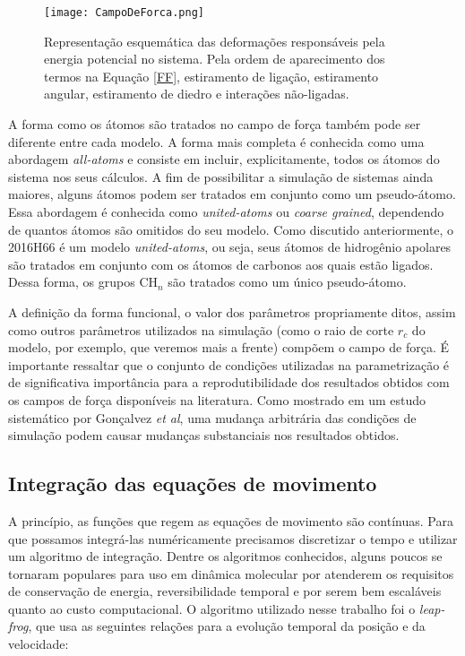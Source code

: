 \begin{figure}[ht!]
\centering
\texttt{[image: CampoDeForca.png]}
\caption{Representação esquemática das deformações responsáveis pela energia potencial no sistema. Pela ordem de aparecimento dos termos na Equação \ref{FF}, estiramento de ligação, estiramento angular, estiramento de diedro e interações não-ligadas.}
\label{CampoDeForca}
\end{figure}

A forma como os átomos são tratados no campo de força também pode ser diferente entre cada modelo.
A forma mais completa é conhecida como uma abordagem \textit{all-atoms} e consiste em incluir, explicitamente, todos os átomos do sistema nos seus cálculos.
A fim de possibilitar a simulação de sistemas ainda maiores, alguns átomos podem ser tratados em conjunto como um pseudo-átomo.
Essa abordagem é conhecida como \textit{united-atoms} ou \textit{coarse grained}, dependendo de quantos átomos são omitidos do seu modelo\cite{Allen2017}.
Como discutido anteriormente, o 2016H66\cite{Horta2016} é um modelo \textit{united-atoms}, ou seja, seus átomos de hidrogênio apolares são tratados em conjunto com os átomos de carbonos aos quais estão ligados.
Dessa forma, os grupos CH$_n$ são tratados como um único pseudo-átomo.

A definição da forma funcional, o valor dos parâmetros propriamente ditos, assim como outros parâmetros utilizados na simulação (como o raio de corte $r_c$ do modelo, por exemplo, que veremos mais a frente) compõem o campo de força.
É importante ressaltar que o conjunto de condições utilizadas na parametrização é de significativa importância para a reprodutibilidade dos resultados obtidos com os campos de força disponíveis na literatura.
Como mostrado em um estudo sistemático por Gonçalvez \textit{et al}\cite{Goncalvez2018}, uma mudança arbitrária das condições de simulação podem causar mudanças substanciais nos resultados obtidos.

\subsection{Integração das equações de movimento}

A princípio, as funções que regem as equações de movimento são contínuas. Para que possamos integrá-las numéricamente precisamos discretizar o tempo e utilizar um algoritmo de integração.
Dentre os algoritmos conhecidos, alguns poucos se tornaram populares para uso em dinâmica molecular por atenderem os requisitos de conservação de energia, reversibilidade temporal e por serem bem escaláveis quanto ao custo computacional\cite{Frenkel2002}.
O algoritmo utilizado nesse trabalho foi o \textit{leap-frog}, que usa as seguintes relações para a evolução temporal da posição e da velocidade\cite{Leach2001}:

